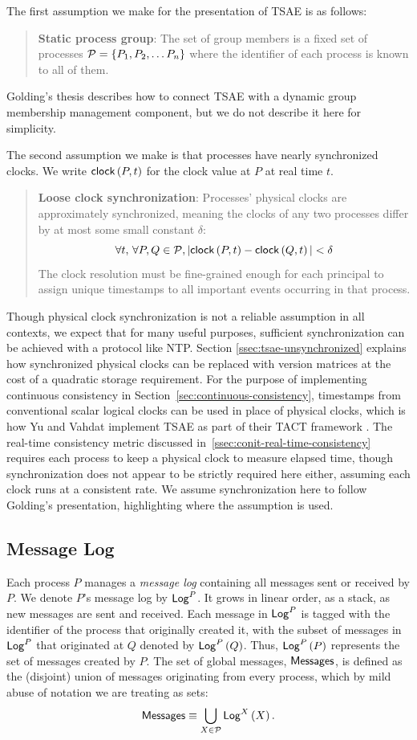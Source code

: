 \documentclass[]             %
{NASA}                       %
\theoremstyle{definition}
\begin{document}
The first assumption we make for the presentation of TSAE is as follows:
\begin{quote}
  \textbf{Static process group}: The set of group members is a fixed
  set of processes $\mathcal{P} = \{P_1, P_2, \ldots P_n\}$ where the
  identifier of each process is known to all of them.
\end{quote}
Golding's thesis describes how to connect TSAE with a dynamic group
membership management component, but we do not describe it here for
simplicity.

The second assumption we make is that processes have nearly
synchronized clocks. We write $\mathsf{clock}\left(P, t\right)$ for the clock value at $P$
at real time $t$.
\begin{quote}
  \textbf{Loose clock synchronization}: Processes' physical clocks are approximately
  synchronized, meaning the clocks of any two processes differ by at
  most some small constant $\delta$:
  \[ \forall t,\, \forall P, Q \in \mathcal{P}, |\mathsf{clock}\left(P, t\right) - \mathsf{clock}\left(Q, t\right)| < \delta
  \]
  The clock resolution must be fine-grained enough for each principal
  to assign unique timestamps to all important events occurring in
  that process.
\end{quote}

Though physical clock synchronization is not a reliable assumption in
all contexts, we expect that for many useful purposes, sufficient
synchronization can be achieved with a protocol like NTP.  Section
\ref{ssec:tsae-unsynchronized} explains how synchronized physical
clocks can be replaced with version matrices at the cost of a
quadratic storage requirement. For the purpose of implementing
continuous consistency in Section~\ref{sec:continuous-consistency},
timestamps from conventional scalar logical clocks can be used in
place of physical clocks, which is how Yu and Vahdat implement TSAE as
part of their TACT framework \cite{2002tact}. The real-time
consistency metric discussed in~\ref{ssec:conit-real-time-consistency}
requires each process to keep a physical clock to measure elapsed
time, though synchronization does not appear to be strictly required
here either, assuming each clock runs at a consistent rate. We assume
synchronization here to follow Golding's presentation, highlighting
where the assumption is used.


\subsection{Message Log}
\label{ssec:tsae-message-log}
Each process $P$ manages a \emph{message log} containing all messages
sent or received by $P$. We denote $P$'s message log by $\mathsf{Log}^{P}$. It
grows in linear order, as a stack, as new messages are sent and
received. Each message in $\mathsf{Log}^{P}$ is tagged with the identifier of
the process that originally created it, with the subset of messages in
$\mathsf{Log}^{P}$ that originated at $Q$ denoted by $\mathsf{Log}^{P}\left(Q\right)$. Thus,
$\mathsf{Log}^{P}\left(P\right)$ represents the set of messages created by $P$. The set
of global messages, $\mathbf{\mathsf{Messages}}$, is defined as the (disjoint) union of
messages originating from every process, which by mild abuse of
notation we are treating as sets:
\[\mathbf{\mathsf{Messages}} \equiv \bigcup_{X \in \mathcal{P}} \mathsf{Log}^{X}\left(X\right).\]
\end{document}
